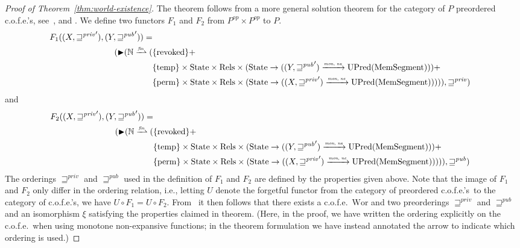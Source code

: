 \documentclass[a4paper]{article}
\newcommand{\finparfun}{\xrightharpoonup{\textit{\tiny{fin}}}}
\newcommand{\monnefun}{\xrightarrow{\textit{\tiny{mon, ne}}}}
\newcommand{\fun}{\rightarrow}
\newcommand{\blater}{\mathop{\blacktriangleright}}
\newcommand{\cofe}{c.o.f.e.}
\newcommand{\cofes}{\cofe{}'s}
\newcommand{\var}[1]{\mathit{#1}}
\newcommand{\futurewk}{\mathbin{\sqsupseteq}^{\var{pub}}}
\newcommand{\futurestr}{\mathbin{\sqsupseteq}^{\var{priv}}}
\newcommand{\plaindom}[1]{\mathrm{#1}}
\newcommand{\HeapSegments}{\plaindom{MemSegment}}
\newcommand{\nats}{\mathbb{N}}
\newcommand{\Rels}{\plaindom{Rels}}
\newcommand{\States}{\plaindom{State}}
\newcommand{\Wor}{\plaindom{Wor}}
\newcommand{\UPred}[1]{\plaindom{UPred}(#1)}
\newcommand{\plainview}[1]{\mathrm{#1}}
\newcommand{\perma}{\plainview{perm}}
\newcommand{\temp}{\plainview{temp}}
\newcommand{\revoked}{\plainview{revoked}}
\begin{document}
\begin{proof}[Proof of Theorem~\ref{thm:world-existence}]
  The theorem follows from a more general solution theorem for the
  category of $P$ preordered \cofes,
  see~\cite{Birkedal:2010:TCS:411:4102-4122}, \cite{Birkedal:tutorial-notes} and \cite{bizjak-note}. 
  We define two functors $F_1$ and $F_2$ from $P^{op}\times P^{op}$ to
  $P$. 
  \begin{align*}
     F_1((X,{\futurestr}'),(Y,{\futurewk}')) = \\
     (\blater (\nats \finparfun ( & \{\revoked\}  + \\
                                          & \{\temp\} \times \States \times \Rels \times (\States \fun ((Y,{\futurewk}') \monnefun \UPred{\HeapSegments})) + \\
                                          & \{\perma\} \times \States
                                            \times \Rels \times
                                            (\States \fun ((X,{\futurestr}')
                                            \monnefun
                                            \UPred{\HeapSegments})))),
                                        \futurestr)
  \end{align*}
  and
  \begin{align*}
     F_2((X,{\futurestr}'),(Y,{\futurewk}')) = \\
     (\blater (\nats \finparfun ( & \{\revoked\}  + \\
                                          & \{\temp\} \times \States \times \Rels \times (\States \fun ((Y,{\futurewk}') \monnefun \UPred{\HeapSegments})) + \\
                                          & \{\perma\} \times \States
                                            \times \Rels \times
                                            (\States \fun ((X,{\futurestr}')
                                            \monnefun
                                            \UPred{\HeapSegments})))),
                                        \futurewk)
  \end{align*}
  The orderings $\futurestr$ and $\futurewk$ used in the definition of
  $F_1$ and $F_2$ are defined by the properties given above.
  Note that the image of $F_1$ and $F_2$ only differ in the ordering
  relation, i.e., letting $U$ denote the forgetful functor from the
  category of preordered \cofes\ to the category of \cofes, we have
  $U \circ F_1 = U \circ F_2$.
  From~\cite{bizjak-note} it then follows that there exists a \cofe\ $\Wor$ and two
  preorderings $\futurestr$ and $\futurewk$ and an isomorphism $\xi$ satisfying the properties
  claimed in theorem.
  (Here, in the proof, we have written the ordering explicitly on the \cofe\ when
  using monotone non-expansive functions; in the theorem formulation
  we have instead annotated the arrow to indicate which ordering is used.)
\end{proof}
\end{document}
